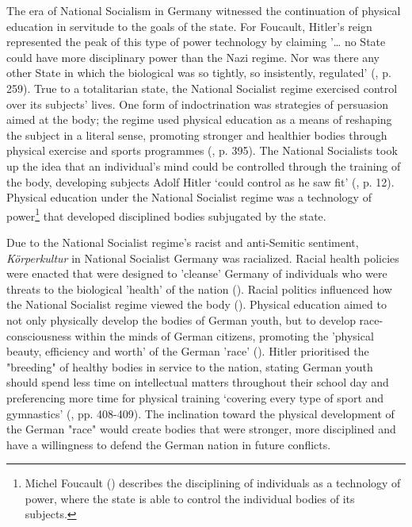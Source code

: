 The era of National Socialism in Germany witnessed the continuation of physical education in servitude to the goals of the state. For Foucault, Hitler’s reign represented the peak of this type of power technology by claiming '… no State could have more disciplinary power than the Nazi regime. Nor was there any other State in which the biological was so tightly, so insistently, regulated' (\cite{foucault1999}, p. 259). True to a totalitarian state, the National Socialist regime exercised control over its subjects’ lives. One form of indoctrination was strategies of persuasion aimed at the body; the regime used physical education as a means of reshaping the subject in a literal sense, promoting stronger and healthier bodies through physical exercise and sports programmes (\cite{keys2009}, p. 395). The National Socialists took up the idea that an individual’s mind could be controlled through the training of the body, developing subjects Adolf Hitler ‘could control as he saw fit’ (\cite{johnsonhumphreyjohnson1957}, p. 12). Physical education under the National Socialist regime was a technology of power\footnote{Michel Foucault (\citeyear{foucault2005}) describes the disciplining of individuals as a technology of power, where the state is able to control the individual bodies of its subjects.} that developed disciplined bodies subjugated by the state.

Due to the National Socialist regime’s racist and anti-Semitic sentiment, \textit{Körperkultur} in National Socialist Germany was racialized. Racial health policies were enacted that were designed to 'cleanse' Germany of individuals who were threats to the biological 'health' of the nation (\cite{burleighwippermann1991}). Racial politics influenced how the National Socialist regime viewed the body (\cite{hirsch2002}). Physical education aimed to not only physically develop the bodies of German youth, but to develop race-consciousness within the minds of German citizens, promoting the 'physical beauty, efficiency and worth' of the German 'race' (\cite{keys2009}). Hitler prioritised the "breeding" of healthy bodies in service to the nation, stating German youth should spend less time on intellectual matters throughout their school day and preferencing more time for physical training ‘covering every type of sport and gymnastics’ (\cite{hitler1971}, pp. 408-409). The inclination toward the physical development of the German "race" would create bodies that were stronger, more disciplined and have a willingness to defend the German nation in future conflicts.

